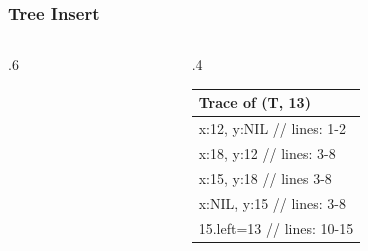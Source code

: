 \documentclass[10pt]{beamer}
\begin{document}
\begin{frame}[t]\frametitle{Tree Insert}
	\begin{columns}[T] %
	\begin{column}{.6\linewidth} %
		{\scriptsize
				
		} %

	\end{column} %
	\begin{column}{.4\linewidth} %

		{\small 
		
		} %
	
		{\footnotesize 
			\begin{tabular}{| l |}
			\hline
			Trace of {\scriptsize \TreeInsert(T, 13)}\\
			\hline
			x:12, y:NIL // lines: 1-2\\
			x:18, y:12 // lines: 3-8\\
			x:15, y:18 // lines 3-8\\
			x:NIL, y:15 // lines: 3-8\\
			15.left=13 // lines: 10-15\\
			\hline
			\end{tabular}
		} %

	\end{column} %
	\end{columns} %
	
\end{frame}
\end{document}
